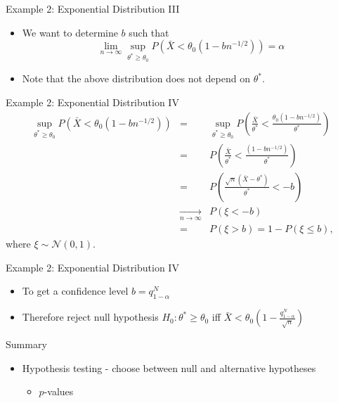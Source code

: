 \documentclass{beamer}
\begin{document}
\begin{frame}{Example 2: Exponential Distribution III} 
\begin{itemize} 
 \item We want to determine $b$ such that 
\begin{displaymath} 
 \lim_{n \rightarrow \infty} \sup_{\theta^* \geq \theta_0}P(\bar{X} < \theta_0(1 - bn^{-1/2})) = \alpha 
\end{displaymath}
\item Note that the above distribution does not depend on $\theta^*$. 
\end{itemize}
\end{frame}

\begin{frame}{Example 2: Exponential Distribution IV} 
\begin{eqnarray*} 
 \sup_{\theta^* \geq \theta_0} P(\bar{X} < \theta_0(1 - bn^{-1/2}))  &=& \sup_{\theta^* \geq \theta_0} P\left(\frac{\bar{X}}{\theta^*} < \frac{\theta_0(1 - bn^{-1/2})}{\theta^*}\right)  \\ 
&=& P\left(\frac{\bar{X}}{\theta^*} < \frac{(1 - bn^{-1/2})}{\theta^*}\right)  \\ 
&=& P\left(\frac{\sqrt{n}(\bar{X} - \theta^*)}{\theta^*} < - b\right)  \\ 
&\xrightarrow[n \rightarrow \infty]{} & P(\xi < -b) \\ 
&=& P(\xi > b) = 1 - P(\xi \leq b),
\end{eqnarray*}
where $\xi \sim \mathcal{N}(0, 1)$. 
\end{frame}

\begin{frame}{Example 2: Exponential Distribution IV} 
\begin{itemize} 
 \item To get a confidence level $b = q^N_{1-\alpha}$ 
\item Therefore reject null hypothesis $H_0: \theta^* \geq \theta_0$ iff $\bar{X} < \theta_0(1 - \frac{q_{1-\alpha}^N}{\sqrt{n}}) $
\end{itemize}
\end{frame}

\begin{frame}{Summary}
\begin{itemize} 
 \item Hypothesis testing - choose between null and alternative hypotheses 
  \begin{itemize}
 \item $p$-values 
  \end{itemize}
\end{itemize}
\end{frame}
\end{document}
